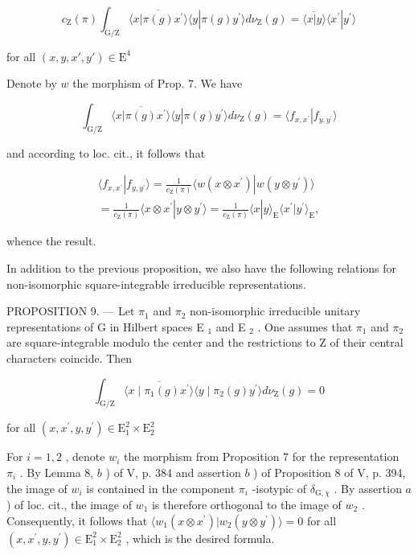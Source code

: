 \[
c _ {\mathrm{Z}} (\pi) \int_ {\mathrm{G} / \mathrm{Z}} \overline {{\langle x | \pi (g) x ^ {\prime} \rangle}} \langle y | \pi (g) y ^ {\prime} \rangle d \nu_ {\mathrm{Z}} (g) = \overline {{\langle x | y \rangle}} \langle x ^ {\prime} | y ^ {\prime} \rangle
\]

for all \((x,y,x',y')\in \mathrm{E}^4\)

Denote by \(w\) the morphism of Prop. 7. We have

\[
\int_ {\mathrm{G} / \mathrm{Z}} \overline {{\langle x | \pi (g) x ^ {\prime} \rangle}} \langle y | \pi (g) y ^ {\prime} \rangle d \nu_ {\mathrm{Z}} (g) = \langle f _ {x, x ^ {\prime}} | f _ {y, y ^ {\prime}} \rangle
\]

and according to loc. cit., it follows that

\[
\begin{array}{c} \langle f _ {x, x ^ {\prime}} | f _ {y, y ^ {\prime}} \rangle = \frac {1}{c _ {\mathrm{Z}} (\pi)} \langle w (x \otimes x ^ {\prime}) | w (y \otimes y ^ {\prime}) \rangle \\ = \frac {1}{c _ {\mathrm{Z}} (\pi)} \langle x \otimes x ^ {\prime} | y \otimes y ^ {\prime} \rangle = \frac {1}{c _ {\mathrm{Z}} (\pi)} \langle x | y \rangle_ {\overline {{\mathrm{E}}}} \langle x ^ {\prime} | y ^ {\prime} \rangle_ {\mathrm{E}}, \end{array}
\]

whence the result.

In addition to the previous proposition, we also have the following relations for non-isomorphic square-integrable irreducible representations.

PROPOSITION 9. --- Let \(\pi_1\) and \(\pi_2\) non-isomorphic irreducible unitary representations of G in Hilbert spaces E \(_1\) and E \(_2\) . One assumes that \(\pi_1\) and \(\pi_2\) are square-integrable modulo the center and the restrictions to Z of their central characters coincide. Then

\[
\int_ {\mathrm{G} / \mathrm{Z}} \overline {{\langle x \mid \pi_ {1} (g) x ^ {\prime} \rangle}} \langle y \mid \pi_ {2} (g) y ^ {\prime} \rangle d \nu_ {\mathrm{Z}} (g) = 0
\]

for all \((x,x^{\prime},y,y^{\prime})\in \mathrm{E}_{1}^{2}\times \mathrm{E}_{2}^{2}\)

 For \(i=1,2\) , denote \(w_{i}\) the morphism from Proposition 7 for the representation \(\pi_{i}\) . By Lemma 8, \(b\) ) of V, p. 384 and assertion \(b\) ) of Proposition 8 of V, p. 394, the image of \(w_{i}\) is contained in the component \(\pi_{i}\) -isotypic of \(\delta_{\mathrm{G},\chi}\) . By assertion \(a\) ) of loc. cit., the image of \(w_{1}\) is therefore orthogonal to the image of \(w_{2}\) . Consequently, it follows that \(\langle w_{1}(x\otimes x^{\prime})|w_{2}(y\otimes y^{\prime})\rangle=0\) for all \((x,x^{\prime},y,y^{\prime})\in\mathrm{E}_{1}^{2}\times\mathrm{E}_{2}^{2}\) , which is the desired formula.

